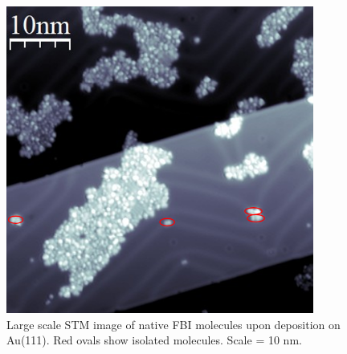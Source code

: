 \documentclass[aps,prl,reprint,longbibliography,superscriptaddress, english]{revtex4-1}
\def\BappCl{BaCl$_2$ }
\newcommand{\completar}[1]{{\color{red} #1}}
\begin{document}

\begin{figure}[ht!]
	\includegraphics[width=0.9\textwidth]{figures/STMlarge.png}
	\caption{\label{Large Scale STM images of FBI} 
    Large scale STM image of native FBI molecules upon deposition on Au(111). Red ovals show isolated molecules. Scale = 10 nm. }
\end{figure}  
\end{document}
